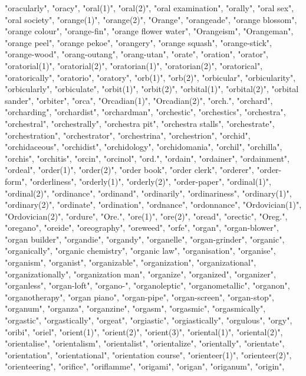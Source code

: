 "oracularly",
"oracy",
"oral(1)",
"oral(2)",
"oral examination",
"orally",
"oral sex",
"oral society",
"orange(1)",
"orange(2)",
"Orange",
"orangeade",
"orange blossom",
"orange colour",
"orange-fin",
"orange flower water",
"Orangeism",
"Orangeman",
"orange peel",
"orange pekoe",
"orangery",
"orange squash",
"orange-stick",
"orange-wood",
"orang-outang",
"orang-utan",
"orate",
"oration",
"orator",
"oratorial(1)",
"oratorial(2)",
"oratorian(1)",
"oratorian(2)",
"oratorical",
"oratorically",
"oratorio",
"oratory",
"orb(1)",
"orb(2)",
"orbicular",
"orbicularity",
"orbicularly",
"orbiculate",
"orbit(1)",
"orbit(2)",
"orbital(1)",
"orbital(2)",
"orbital sander",
"orbiter",
"orca",
"Orcadian(1)",
"Orcadian(2)",
"orch.",
"orchard",
"orcharding",
"orchardist",
"orchardman",
"orchestic",
"orchestics",
"orchestra",
"orchestral",
"orchestrally",
"orchestra pit",
"orchestra stalls",
"orchestrate",
"orchestration",
"orchestrator",
"orchestrina",
"orchestrion",
"orchid",
"orchidaceous",
"orchidist",
"orchidology",
"orchidomania",
"orchil",
"orchilla",
"orchis",
"orchitis",
"orcin",
"orcinol",
"ord.",
"ordain",
"ordainer",
"ordainment",
"ordeal",
"order(1)",
"order(2)",
"order book",
"order clerk",
"orderer",
"order-form",
"orderliness",
"orderly(1)",
"orderly(2)",
"order-paper",
"ordinal(1)",
"ordinal(2)",
"ordinance",
"ordinand",
"ordinarily",
"ordinariness",
"ordinary(1)",
"ordinary(2)",
"ordinate",
"ordination",
"ordnance",
"ordonnance",
"Ordovician(1)",
"Ordovician(2)",
"ordure",
"Ore.",
"ore(1)",
"ore(2)",
"oread",
"orectic",
"Oreg.",
"oregano",
"oreide",
"oreography",
"oreweed",
"orfe",
"organ",
"organ-blower",
"organ builder",
"organdie",
"organdy",
"organelle",
"organ-grinder",
"organic",
"organically",
"organic chemistry",
"organic law",
"organisation",
"organise",
"organism",
"organist",
"organizable",
"organization",
"organizational",
"organizationally",
"organization man",
"organize",
"organized",
"organizer",
"organless",
"organ-loft",
"organo-",
"organoleptic",
"organometallic",
"organon",
"organotherapy",
"organ piano",
"organ-pipe",
"organ-screen",
"organ-stop",
"organum",
"organza",
"organzine",
"orgasm",
"orgasmic",
"orgasmically",
"orgastic",
"orgastically",
"orgeat",
"orgiastic",
"orgiastically",
"orgulous",
"orgy",
"oribi",
"oriel",
"orient(1)",
"orient(2)",
"orient(3)",
"oriental(1)",
"oriental(2)",
"orientalise",
"orientalism",
"orientalist",
"orientalize",
"orientally",
"orientate",
"orientation",
"orientational",
"orientation course",
"orienteer(1)",
"orienteer(2)",
"orienteering",
"orifice",
"oriflamme",
"origami",
"origan",
"origanum",
"origin",
